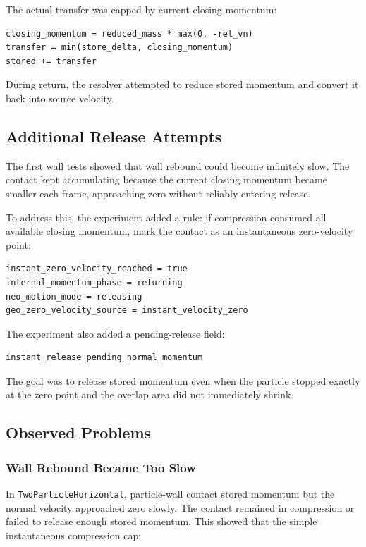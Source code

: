 The actual transfer was capped by current closing momentum:

\begin{verbatim}
closing_momentum = reduced_mass * max(0, -rel_vn)
transfer = min(store_delta, closing_momentum)
stored += transfer
\end{verbatim}

During return, the resolver attempted to reduce stored momentum and convert it
back into source velocity.

\subsection{Additional Release Attempts}

The first wall tests showed that wall rebound could become infinitely slow.  The
contact kept accumulating because the current closing momentum became smaller
each frame, approaching zero without reliably entering release.

To address this, the experiment added a rule: if compression consumed all
available closing momentum, mark the contact as an instantaneous zero-velocity
point:

\begin{verbatim}
instant_zero_velocity_reached = true
internal_momentum_phase = returning
neo_motion_mode = releasing
geo_zero_velocity_source = instant_velocity_zero
\end{verbatim}

The experiment also added a pending-release field:

\begin{verbatim}
instant_release_pending_normal_momentum
\end{verbatim}

The goal was to release stored momentum even when the particle stopped exactly
at the zero point and the overlap area did not immediately shrink.

\subsection{Observed Problems}

\subsubsection{Wall Rebound Became Too Slow}

In \texttt{TwoParticleHorizontal}, particle-wall contact stored momentum but the
normal velocity approached zero slowly.  The contact remained in compression or
failed to release enough stored momentum.  This showed that the simple
instantaneous compression cap:

